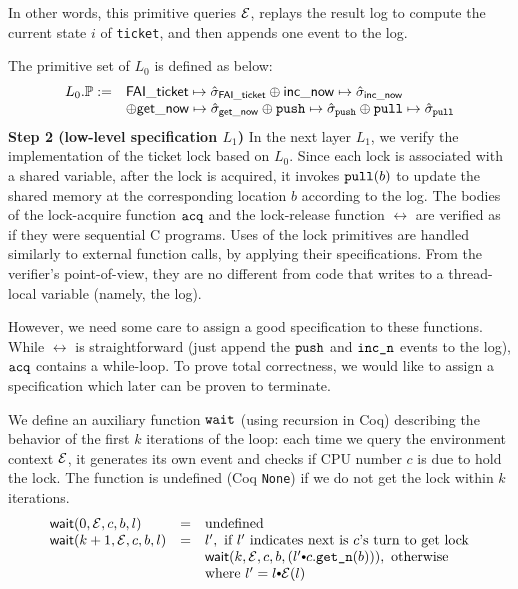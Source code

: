 {In other words, this primitive queries $\mathcal{E}$, replays the result log to
compute the current state $i$ of {\tt ticket},
and then appends one
 event to the log. 
The primitive set of $L_0$ is defined as below:
\[
\begin{array}{rl}
L_0.\mathbb{P} := &\mathsf{FAI\_ticket} \mapsto \hat{\sigma}_{\mathsf{FAI\_ticket}}
\oplus \mathsf{inc\_now} \mapsto \hat{\sigma}_{\mathsf{inc\_now}} \\
&\oplus \mathsf{get\_now} \mapsto \hat{\sigma}_{\mathsf{get\_now}}\oplus  {\texttt{push}}\mapsto \hat{\sigma}_{{\texttt{push}}}
\oplus  {\texttt{pull}}\mapsto \hat{\sigma}_{{\texttt{pull}}}
\end{array}
\]%
\noindent\textbf{Step 2 (low-level specification $L_1$)}
In the next layer $L_1$, 
we verify the implementation of the ticket lock based on
 $L_0$. Since each lock is associated with a shared variable,
after the lock is acquired, it invokes ${\texttt{pull}}(b)$ 
to update the shared memory at the corresponding location $b$
according to the log.
The bodies of the lock-acquire function ${\texttt{acq}}$ and 
the lock-release function $\rel$ are verified as if they were 
sequential C programs. Uses of the lock primitives are handled
similarly to external function calls, by applying their
specifications. From the verifier's point-of-view, they are no 
different from code
that writes to a thread-local variable (namely, the log). 

However, we need some care to assign a good specification to these
functions. While $\rel$ is straightforward (just append the
${\texttt{push}}$ and ${\texttt{inc\_n}}$ events to the log), 
${\texttt{acq}}$ contains a while-loop. To prove total correctness,
we would like to assign a specification which later can be proven
to terminate.

We define an auxiliary function ${\texttt{wait}}$
(using recursion in Coq) describing the behavior of the first $k$
iterations of the loop: each time we query the environment
context $\mathcal{E}$, it generates its own
event and checks if CPU number $c$ is due to hold the
lock. The function is undefined (Coq {\tt None}) if we do not get the
lock within $k$ iterations.
\[
\begin{array}{lcl}
\mathsf{wait}(0, \oracle, c, b, l) & = &\text{undefined} \\
\mathsf{wait}(k+1, \oracle, c, b, l) & = & l', \text{ if $l'$ indicates next is $c$'s turn to get lock}\\
                       & &   \mathsf{wait}(k, \oracle, c,  b, (l' \cons c.\getnow(b))), \text{ otherwise} \\
                       & &  \text{where }l' = l \cons  \oracle(l)
\end{array}
\]%

}
